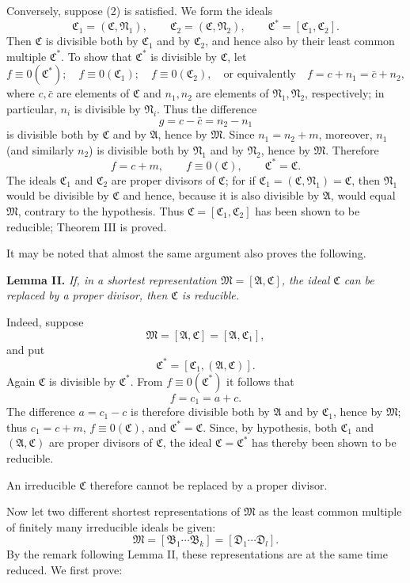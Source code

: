 \documentclass[11pt]{article}
\providecommand{\ideal}[1]{\mathfrak{#1}}
\begin{document}
Conversely, suppose (2) is satisfied. We form the ideals
\[
 \ideal C_1=(\ideal C,\ideal N_1),\qquad
 \ideal C_2=(\ideal C,\ideal N_2),\qquad
 \ideal C^*=[\ideal C_1,\ideal C_2].
\]
Then $\ideal C$ is divisible both by $\ideal C_1$ and by $\ideal C_2$, and hence also by their least common multiple $\ideal C^*$. To show that $\ideal C^*$ is divisible by $\ideal C$, let
\[
 f\equiv0(\ideal C^*);\quad f\equiv0(\ideal C_1);\quad f\equiv0(\ideal C_2),
 \quad\text{or equivalently}\quad f=c+n_1=\bar c+n_2,
\]
where $c,\bar c$ are elements of $\ideal C$ and $n_1,n_2$ are elements of $\ideal N_1,\ideal N_2$, respectively; in particular, $n_i$ is divisible by $\ideal N_i$. Thus the difference
\[
 g=c-\bar c=n_2-n_1
\]
is divisible both by $\ideal C$ and by $\ideal A$, hence by $\ideal M$. Since $n_1=n_2+m$, moreover, $n_1$ (and similarly $n_2$) is divisible both by $\ideal N_1$ and by $\ideal N_2$, hence by $\ideal M$. Therefore
\[
 f=c+m,\qquad f\equiv0(\ideal C),\qquad \ideal C^*=\ideal C.
\]
The ideals $\ideal C_1$ and $\ideal C_2$ are proper divisors of $\ideal C$; for if $\ideal C_1=(\ideal C,\ideal N_1)=\ideal C$, then $\ideal N_1$ would be divisible by $\ideal C$ and hence, because it is also divisible by $\ideal A$, would equal $\ideal M$, contrary to the hypothesis. Thus $\ideal C=[\ideal C_1,\ideal C_2]$ has been shown to be reducible; Theorem III is proved.

It may be noted that almost the same argument also proves the following.

\textbf{Lemma II.} \emph{If, in a shortest representation $\ideal M=[\ideal A,\ideal C]$, the ideal $\ideal C$ can be replaced by a proper divisor, then $\ideal C$ is reducible.}

Indeed, suppose
\[
 \ideal M=[\ideal A,\ideal C]=[\ideal A,\ideal C_1],
\]
and put
\[
 \ideal C^*=[\ideal C_1,(\ideal A,\ideal C)].
\]
Again $\ideal C$ is divisible by $\ideal C^*$. From $f\equiv0(\ideal C^*)$ it follows that
\[
 f=c_1=a+c.
\]
The difference $a=c_1-c$ is therefore divisible both by $\ideal A$ and by $\ideal C_1$, hence by $\ideal M$; thus $c_1=c+m$, $f\equiv0(\ideal C)$, and $\ideal C^*=\ideal C$. Since, by hypothesis, both $\ideal C_1$ and $(\ideal A,\ideal C)$ are proper divisors of $\ideal C$, the ideal $\ideal C=\ideal C^*$ has thereby been shown to be reducible.

An irreducible $\ideal C$ therefore cannot be replaced by a proper divisor.

Now let two different shortest representations of $\ideal M$ as the least common multiple of finitely many irreducible ideals be given:
\[
 \ideal M=[\ideal B_1\cdots\ideal B_k]=[\ideal D_1\cdots\ideal D_l].
\]
By the remark following Lemma II, these representations are at the same time reduced. We first prove:
\end{document}
